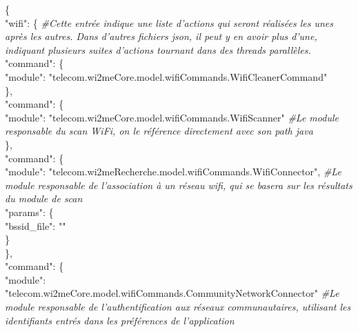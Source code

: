 \documentclass[11pt]{article}
\newcommand\mtext[2]{#1}
\newcommand\mtext[2]{#2}
\begin{document}
\{ \\
\hspace*{6mm}  "wifi": \{ \textit{\#\mtext{Cette entrée indique une liste d'actions qui
seront réalisées les unes après les autres. Dans d'autres fichiers json, il peut
y en avoir plus d'une, indiquant plusieurs suites d'actions tournant dans des
threads parallèles.}{Dans This top level entry indicates a list of
actions to be performed one after the other. In other json files, there are mode
than one, that run in parallel threads.}} \\ 
\hspace*{12mm}"command": \{ \\
\hspace*{18mm}"module": "telecom.wi2meCore.model.wifiCommands.WifiCleanerCommand" \\
\hspace*{12mm}\}, \\
\hspace*{12mm}"command": \{ \\
\hspace*{18mm}"module": "telecom.wi2meCore.model.wifiCommands.WifiScanner"
\textit{\#\mtext{Le module responsable du scan WiFi, on le référence directement
avec son path java}{} }\\
\hspace*{12mm}\}, \\
\hspace*{12mm}"command": \{ \\
\hspace*{18mm}"module":
"telecom.wi2meRecherche.model.wifiCommands.WifiConnector", \textit{\#\mtext{Le
module responsable de l'association à un réseau wifi, qui se basera sur les
résultats du module de scan}{} }\\
\hspace*{18mm}"params": \{ \\
\hspace*{24mm}"bssid\_file": "" \\
\hspace*{18mm}\} \\
\hspace*{12mm}\}, \\
\hspace*{12mm}"command": \{ \\
\hspace*{18mm}"module":
"telecom.wi2meCore.model.wifiCommands.CommunityNetworkConnector"
\textit{\#\mtext{Le module responsable de l'authentification aux réseaux
communautaires, utilisant les identifiants entrés dans les préférences de
l'application}{} }\\
\end{document}
